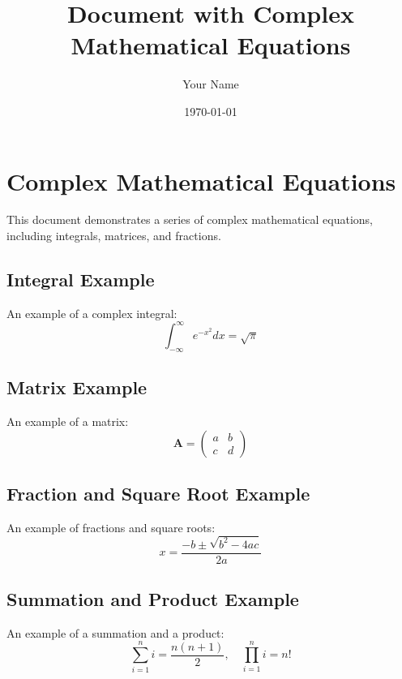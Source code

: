 \documentclass[11pt,a4paper]{article}
\title{Document with Complex Mathematical Equations}
\author{Your Name}
\date{\today}
\begin{document}
\maketitle

\section{Complex Mathematical Equations}

This document demonstrates a series of complex mathematical equations, including integrals, matrices, and fractions.

\subsection{Integral Example}
An example of a complex integral:
\begin{equation}
\int_{-\infty}^{\infty} e^{-x^2} dx = \sqrt{\pi}
\end{equation}

\subsection{Matrix Example}
An example of a matrix:
\begin{equation}
\mathbf{A} = 
\begin{pmatrix}
a & b \\
c & d 
\end{pmatrix}
\end{equation}

\subsection{Fraction and Square Root Example}
An example of fractions and square roots:
\begin{equation}
x = \frac{-b \pm \sqrt{b^2 - 4ac}}{2a}
\end{equation}

\subsection{Summation and Product Example}
An example of a summation and a product:
\begin{equation}
\sum_{i=1}^{n} i = \frac{n(n+1)}{2}, \quad \prod_{i=1}^{n} i = n!
\end{equation}
\end{document}
